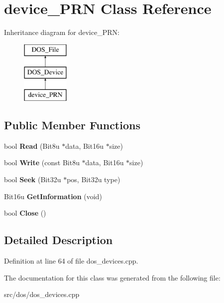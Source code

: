\hypertarget{classdevice__PRN}{\section{device\-\_\-\-P\-R\-N Class Reference}
\label{classdevice__PRN}
}
Inheritance diagram for device\-\_\-\-P\-R\-N\-:\begin{figure}[H]
\begin{center}
\leavevmode
\includegraphics[height=3.000000cm]{classdevice__PRN}
\end{center}
\end{figure}
\subsection*{Public Member Functions}
\begin{DoxyCompactItemize}
\item 
\hypertarget{classdevice__PRN_ab2635625d0731e0733c11b2cd0732b27}{bool {\bfseries Read} (Bit8u $\ast$data, Bit16u $\ast$size)}\label{classdevice__PRN_ab2635625d0731e0733c11b2cd0732b27}

\item 
\hypertarget{classdevice__PRN_aaa2b70ef35d27fbec4ff1df9af4c6d66}{bool {\bfseries Write} (const Bit8u $\ast$data, Bit16u $\ast$size)}\label{classdevice__PRN_aaa2b70ef35d27fbec4ff1df9af4c6d66}

\item 
\hypertarget{classdevice__PRN_a587013dc3143e4832d6119effe656a61}{bool {\bfseries Seek} (Bit32u $\ast$pos, Bit32u type)}\label{classdevice__PRN_a587013dc3143e4832d6119effe656a61}

\item 
\hypertarget{classdevice__PRN_a65d97b1a638d41ac89e58a4f3a5c5d84}{Bit16u {\bfseries Get\-Information} (void)}\label{classdevice__PRN_a65d97b1a638d41ac89e58a4f3a5c5d84}

\item 
\hypertarget{classdevice__PRN_a92e246dc979d2faef8a0c48700f665ed}{bool {\bfseries Close} ()}\label{classdevice__PRN_a92e246dc979d2faef8a0c48700f665ed}

\end{DoxyCompactItemize}


\subsection{Detailed Description}


Definition at line 64 of file dos\-\_\-devices.\-cpp.



The documentation for this class was generated from the following file\-:\begin{DoxyCompactItemize}
\item 
src/dos/dos\-\_\-devices.\-cpp\end{DoxyCompactItemize}
